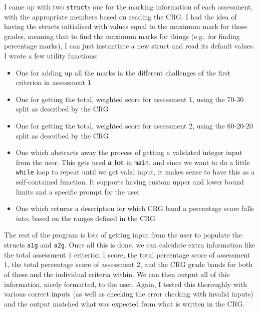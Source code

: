 \documentclass[
]{article}
\providecommand{\tightlist}{%
  \setlength{\itemsep}{0pt}\setlength{\parskip}{0pt}}
\begin{document}
I came up with two \texttt{struct}s one for the marking information of
each assessment, with the appropriate members based on reading the CRG.
I had the idea of having the structs initialised with values equal to
the maximum mark for those grades, meaning that to find the maximum
marks for things (e.g.~for finding percentage marks), I can just
instantiate a new struct and read its default values. I wrote a few
utility functions:

\begin{itemize}
\tightlist
\item
  One for adding up all the marks in the different challenges of the
  first criterion in assessment 1
\item
  One for getting the total, weighted score for assessment 1, using the
  70-30 split as described by the CRG
\item
  One for getting the total, weighted score for assessment 2, using the
  60-20-20 split as described by the CRG
\item
  One which abstracts away the process of getting a validated integer
  input from the user. This gets used \textbf{a lot} in \texttt{main},
  and since we want to do a little \texttt{while} loop to repeat until
  we get valid input, it makes sense to have this as a self-contained
  function. It supports having custom upper and lower bound limits and a
  specific prompt for the user
\item
  One which returns a description for which CRG band a percentage score
  falls into, based on the ranges defined in the CRG
\end{itemize}

The rest of the program is lots of getting input from the user to
populate the structs \texttt{a1g} and \texttt{a2g}. Once all this is
done, we can calculate extra information like the total assessment 1
criterion 1 score, the total percentage score of assessment 1, the total
percentage score of assessment 2, and the CRG grade bands for both of
these and the individual criteria within. We can then output all of this
information, nicely formatted, to the user. Again, I tested this
thoroughly with various correct inputs (as well as checking the error
checking with invalid inputs) and the output matched what was expected
from what is written in the CRG.
\end{document}
